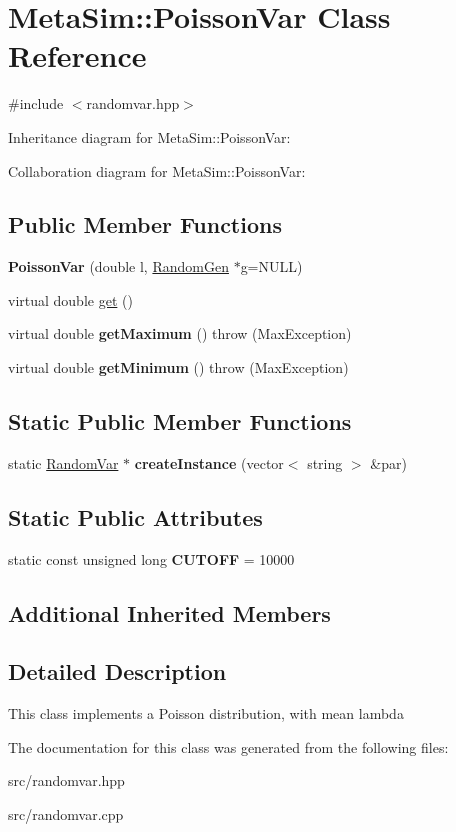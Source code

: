 \hypertarget{classMetaSim_1_1PoissonVar}{}\section{Meta\+Sim\+:\+:Poisson\+Var Class Reference}
\label{classMetaSim_1_1PoissonVar}


{\ttfamily \#include $<$randomvar.\+hpp$>$}



Inheritance diagram for Meta\+Sim\+:\+:Poisson\+Var\+:


Collaboration diagram for Meta\+Sim\+:\+:Poisson\+Var\+:
\subsection*{Public Member Functions}
\begin{DoxyCompactItemize}
\item 
{\bfseries Poisson\+Var} (double l, \hyperlink{classMetaSim_1_1RandomGen}{Random\+Gen} $\ast$g=N\+U\+LL)
\item 
virtual double \hyperlink{group__metasim__random_gad487efc5f4bdde3e38e8bea5f937ef9b}{get} ()
\item 
virtual double {\bfseries get\+Maximum} ()  throw (\+Max\+Exception)
\item 
virtual double {\bfseries get\+Minimum} ()  throw (\+Max\+Exception)
\end{DoxyCompactItemize}
\subsection*{Static Public Member Functions}
\begin{DoxyCompactItemize}
\item 
static \hyperlink{classMetaSim_1_1RandomVar}{Random\+Var} $\ast$ {\bfseries create\+Instance} (vector$<$ string $>$ \&par)
\end{DoxyCompactItemize}
\subsection*{Static Public Attributes}
\begin{DoxyCompactItemize}
\item 
static const unsigned long {\bfseries C\+U\+T\+O\+FF} = 10000
\end{DoxyCompactItemize}
\subsection*{Additional Inherited Members}


\subsection{Detailed Description}
This class implements a Poisson distribution, with mean lambda 

The documentation for this class was generated from the following files\+:\begin{DoxyCompactItemize}
\item 
src/randomvar.\+hpp\item 
src/randomvar.\+cpp\end{DoxyCompactItemize}
